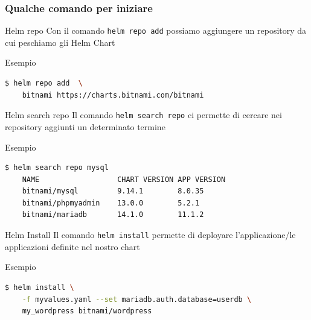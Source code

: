 \documentclass{beamer}
\begin{document}
 \begin{frame}
 \frametitle{Qualche comando per iniziare}
 \begin{block}{Helm repo}
  Con il comando \lstinline[language=bash]{helm repo add} possiamo aggiungere un repository da cui peschiamo gli Helm Chart
  \end{block}
  \framebreak
  \begin{block}{Esempio}
  \begin{lstlisting}[backgroundcolor=\color{white},language=bash,basicstyle=\small]
  $ helm repo add  \
    bitnami https://charts.bitnami.com/bitnami
  \end{lstlisting}
  \end{block}
  \framebreak
  
  \begin{block}{Helm search repo}
  Il comando \lstinline[language=bash]{helm search repo} ci permette di cercare nei repository aggiunti un determinato termine
  \end{block}
  
  \framebreak
  \begin{block}{Esempio}
  \begin{lstlisting}[backgroundcolor=\color{white},language=bash,basicstyle=\small]
  $ helm search repo mysql
    NAME                  CHART VERSION APP VERSION                                       
    bitnami/mysql         9.14.1        8.0.35     
    bitnami/phpmyadmin    13.0.0        5.2.1      
    bitnami/mariadb       14.1.0        11.1.2     
  \end{lstlisting}
  \end{block}
  \framebreak
  
  \begin{block}{Helm Install}
  Il comando \lstinline[language=bash]{helm install} permette di deployare l'applicazione/le applicazioni definite nel nostro chart
  \end{block}
  
  \framebreak
  \begin{block}{Esempio}
  \begin{lstlisting}[backgroundcolor=\color{white},language=bash,basicstyle=\small]
  $ helm install \
    -f myvalues.yaml --set mariadb.auth.database=userdb \ 
    my_wordpress bitnami/wordpress
  \end{lstlisting}
  \end{block}
 \end{frame}
\end{document}

